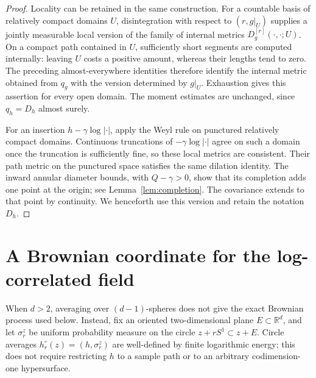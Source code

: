 \documentclass[11pt,reqno]{amsart}
\theoremstyle{plain}
\theoremstyle{definition}
\theoremstyle{remark}
\newcommand{\R}{\mathbb R}
\newcommand{\1}{\mathbf{1}}
\begin{document}
\begin{proof}
Locality can be retained in the same construction. For a countable basis of relatively compact domains $U$, disintegration with respect to $(r,g|_U)$ supplies a jointly measurable local version of the family of internal metrics $D_g^{[r]}(\cdot,\cdot;U)$. On a compact path contained in $U$, sufficiently short segments are computed internally: leaving $U$ costs a positive amount, whereas their lengths tend to zero. The preceding almost-everywhere identities therefore identify the internal metric obtained from $q_g$ with the version determined by $g|_U$. Exhaustion gives this assertion for every open domain. The moment estimates are unchanged, since $q_h=D_h$ almost surely.

For an insertion $h-\gamma\log|\cdot|$, apply the Weyl rule on punctured relatively compact domains. Continuous truncations of $-\gamma\log|\cdot|$ agree on such a domain once the truncation is sufficiently fine, so these local metrics are consistent. Their path metric on the punctured space satisfies the same dilation identity. The inward annular diameter bounds, with $Q-\gamma>0$, show that its completion adds one point at the origin; see Lemma~\ref{lem:completion}. The covariance extends to that point by continuity. We henceforth use this version and retain the notation $D_h$.
\end{proof}

\section{A Brownian coordinate for the log-correlated field}\label{sec:brownian}
When $d>2$, averaging over $(d-1)$-spheres does not give the exact Brownian process used below. Instead, fix an oriented two-dimensional plane $E\subset\R^d$, and let $\sigma_r^z$ be uniform probability measure on the circle $z+rS^1\subset z+E$. Circle averages $h_r^\circ(z)=(h,\sigma_r^z)$ are well-defined by finite logarithmic energy; this does not require restricting $h$ to a sample path or to an arbitrary codimension-one hypersurface.
\end{document}
